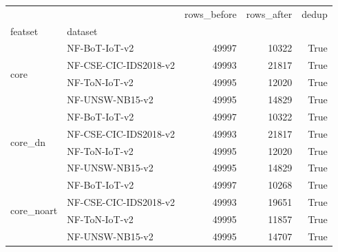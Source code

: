 \begin{tabular}{llrrr}
\toprule
 &  & rows_before & rows_after & dedup \\
featset & dataset &  &  &  \\
\midrule
\multirow[t]{4}{*}{core} & NF-BoT-IoT-v2 & 49997 & 10322 & True \\
 & NF-CSE-CIC-IDS2018-v2 & 49993 & 21817 & True \\
 & NF-ToN-IoT-v2 & 49995 & 12020 & True \\
 & NF-UNSW-NB15-v2 & 49995 & 14829 & True \\
\cline{1-5}
\multirow[t]{4}{*}{core_dn} & NF-BoT-IoT-v2 & 49997 & 10322 & True \\
 & NF-CSE-CIC-IDS2018-v2 & 49993 & 21817 & True \\
 & NF-ToN-IoT-v2 & 49995 & 12020 & True \\
 & NF-UNSW-NB15-v2 & 49995 & 14829 & True \\
\cline{1-5}
\multirow[t]{4}{*}{core_noart} & NF-BoT-IoT-v2 & 49997 & 10268 & True \\
 & NF-CSE-CIC-IDS2018-v2 & 49993 & 19651 & True \\
 & NF-ToN-IoT-v2 & 49995 & 11857 & True \\
 & NF-UNSW-NB15-v2 & 49995 & 14707 & True \\
\cline{1-5}
\bottomrule
\end{tabular}
